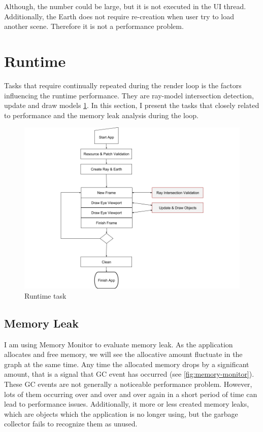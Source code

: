 Although, the number could be large, but it is not executed in the UI thread. Additionally, the Earth does not require re-creation when user try to load another scene. Therefore it is not a performance problem.

\section{Runtime}

Tasks that require continually repeated during the render loop is the factors influencing the runtime performance. They are ray-model intersection detection, update and draw models \ref{fig:runtime-task}. In this section, I present the tasks that closely related to performance and the memory leak analysis during the loop.
 
\begin{figure}[H]
	\caption{Runtime task}
	\label{fig:runtime-task}
	\centering
	\includegraphics[width=\textwidth, keepaspectratio]{Figures/runtime-task.png}
	\decoRule
\end{figure}


\subsection{Memory Leak}

I am using Memory Monitor to evaluate memory leak. As the application allocates and free memory, we will see the allocative amount fluctuate in the graph at the same time. Any time the allocated memory drops by a significant amount, that is a signal that GC event has occurred (see \ref{fig:memory-monitor}). These GC events are not generally a noticeable performance problem. However, lots of them occurring over and over and over again in a short period of time can lead to performance issues. Additionally, it more or less created memory leaks, which are objects which the application is no longer using, but the garbage collector fails to recognize them as unused.

